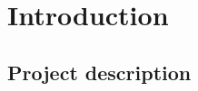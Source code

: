 \chapter{Introduction}


\section{Project description}
\label{sec:project-description} 
\cite{snowsim1}
\cite{snowsim2}
\cite{snowsim3}
\cite{roadgen}
\cite{roadgen2}
\cite{usgsdem}
\cite{clothoid}
\cite{astar}
\cite{roadxml}
